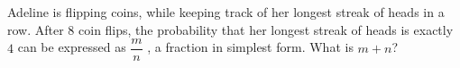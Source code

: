 Adeline is flipping coins, while keeping track of her longest streak of heads in a row. After $8$ coin flips, the probability that her longest streak of heads is exactly $4$ can be expressed as $\dfrac{m}{n}$ , a fraction in simplest form. What is $m + n$?
